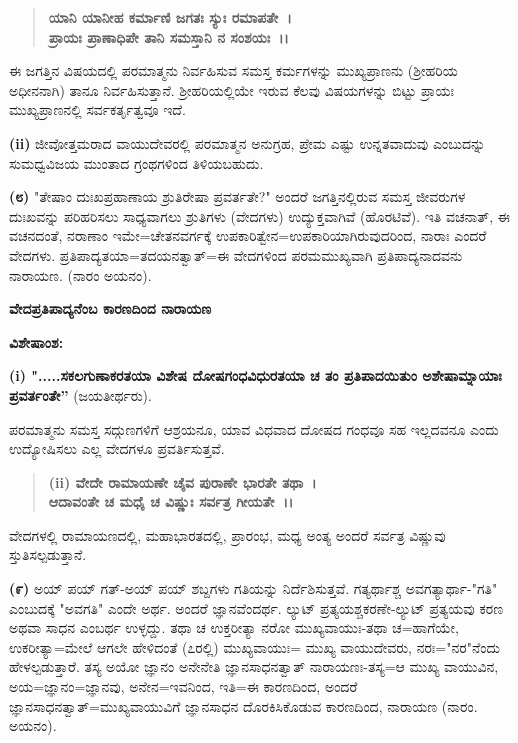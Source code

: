 \begin{verse}
\textbf{ಯಾನಿ ಯಾನೀಹ ಕರ್ಮಾಣಿ ಜಗತಃ ಸ್ಯುಃ ರಮಾಪತೇ~।}\\\textbf{ಪ್ರಾಯಃ ಪ್ರಾಣಾಧಿಪೇ ತಾನಿ ಸಮಸ್ತಾನಿ ನ ಸಂಶಯಃ~।।}
\end{verse}


ಈ ಜಗತ್ತಿನ ವಿಷಯದಲ್ಲಿ ಪರಮಾತ್ಮನು ನಿರ್ವಹಿಸುವ ಸಮಸ್ತ ಕರ್ಮಗಳನ್ನು ಮುಖ್ಯಪ್ರಾಣನು (ಶ‍್ರೀಹರಿಯ ಅಧೀನನಾಗಿ) ತಾನೂ ನಿರ್ವಹಿಸುತ್ತಾನೆ. ಶ‍್ರೀಹರಿಯಲ್ಲಿಯೇ ಇರುವ ಕೆಲವು ವಿಷಯಗಳನ್ನು ಬಿಟ್ಟು ಪ್ರಾಯಃ ಮುಖ್ಯಪ್ರಾಣನಲ್ಲಿ ಸರ್ವಕರ್ತೃತ್ವವೂ ಇದೆ.

\textbf{(ii)} ಜೀವೋತ್ತಮರಾದ ವಾಯುದೇವರಲ್ಲಿ ಪರಮಾತ್ಮನ ಅನುಗ್ರಹ, ಪ್ರೇಮ ಎಷ್ಟು ಉನ್ನತವಾದುವು ಎಂಬುದನ್ನು ಸುಮಧ್ವವಿಜಯ ಮುಂತಾದ ಗ್ರಂಥಗಳಿಂದ ತಿಳಿಯಬಹುದು.

\textbf{(೮)} "ತೇಷಾಂ ದುಃಖಪ್ರಹಾಣಾಯ ಶ್ರುತಿರೇಷಾ ಪ್ರವರ್ತತೇ?" ಅಂದರೆ ಜಗತ್ತಿನಲ್ಲಿರುವ ಸಮಸ್ತ ಜೀವರುಗಳ ದುಃಖವನ್ನು ಪರಿಹರಿಸಲು ಸಾಧ್ಯವಾಗಲು ಶ್ರುತಿಗಳು (ವೇದಗಳು) ಉದ್ಯುಕ್ತವಾಗಿವೆ (ಹೊರಟಿವೆ). ಇತಿ ವಚನಾತ್, ಈ ವಚನದಂತೆ, ನರಾಣಾಂ ಇಮೇ=ಚೇತನವರ್ಗಕ್ಕೆ ಉಪಕಾರಿತ್ವೇನ=ಉಪಕಾರಿಯಾಗಿರುವುದರಿಂದ, ನಾರಾಃ ಎಂದರೆ ವೇದಗಳು. ಪ್ರತಿಪಾದ್ಯತಯಾ=ತದಯನತ್ವಾತ್=ಈ ವೇದಗಳಿಂದ ಪರಮಮುಖ್ಯವಾಗಿ ಪ್ರತಿಪಾದ್ಯನಾದವನು ನಾರಾಯಣ. (ನಾರಂ ಅಯನಂ).

\begin{center}
\textbf{ವೇದಪ್ರತಿಪಾದ್ಯನೆಂಬ ಕಾರಣದಿಂದ ನಾರಾಯಣ}
\end{center}

\noindent
\textbf{ವಿಶೇಷಾಂಶ:\enginline{-}}

\textbf{(i) ".....ಸಕಲಗುಣಾಕರತಯಾ ವಿಶೇಷ ದೋಷಗಂಧವಿಧುರತಯಾ ಚ ತಂ ಪ್ರತಿಪಾದಯಿತುಂ ಅಶೇಷಾಮ್ನಾಯಾಃ ಪ್ರವರ್ತಂತೇ”} (ಜಯತೀರ್ಥರು).

ಪರಮಾತ್ಮನು ಸಮಸ್ತ ಸದ್ಗುಣಗಳಿಗೆ ಆಶ್ರಯನೂ, ಯಾವ ವಿಧವಾದ ದೋಷದ ಗಂಧವೂ ಸಹ ಇಲ್ಲದವನೂ ಎಂದು ಉದ್ಯೋಷಿಸಲು ಎಲ್ಲ ವೇದಗಳೂ ಪ್ರವರ್ತಿಸುತ್ತವೆ.

\begin{verse}
\textbf{(ii) ವೇದೇ ರಾಮಾಯಣೇ ಚೈವ ಪುರಾಣೇ ಭಾರತೇ ತಥಾ~।}\\\textbf{ಆದಾವಂತೇ ಚ ಮಧೈ ಚ ವಿಷ್ಣುಃ ಸರ್ವತ್ರ ಗೀಯತೇ~।।}
\end{verse}


ವೇದಗಳಲ್ಲಿ ರಾಮಾಯಣದಲ್ಲಿ, ಮಹಾಭಾರತದಲ್ಲಿ, ಪ್ರಾರಂಭ, ಮಧ್ಯ ಅಂತ್ಯ ಅಂದರೆ ಸರ್ವತ್ರ ವಿಷ್ಣುವು ಸ್ತುತಿಸಲ್ಪಡುತ್ತಾನೆ.

\textbf{(೯)} ಅಯ್ ಪಯ್ ಗತ್‌-ಅಯ್ ಪಯ್ ಶಬ್ದಗಳು ಗತಿಯನ್ನು ನಿರ್ದೆಶಿಸುತ್ತವೆ. ಗತ್ಯರ್ಥಾಶ್ಚ ಅವಗತ್ಯಾರ್ಥಾ-"ಗತಿ" ಎಂಬುದಕ್ಕೆ "ಅವಗತಿ" ಎಂದೇ ಅರ್ಥ. ಅಂದರೆ ಜ್ಞಾನವೆಂದರ್ಥ. ಲ್ಯುಟ್ ಪ್ರತ್ಯಯಶ್ಚಕರಣೇ-ಲ್ಯುಟ್ ಪ್ರತ್ಯಯವು ಕರಣ ಅಥವಾ ಸಾಧನ ಎಂಬರ್ಥ ಉಳ್ಳದ್ದು. ತಥಾ ಚ ಉಕ್ತರೀತ್ಯಾ ನರೋ ಮುಖ್ಯವಾಯುಃ-ತಥಾ ಚ=ಹಾಗೆಯೇ, ಉಕರೀತ್ಯಾ=ಮೇಲೆ ಆಗಲೇ ಹೇಳಿದಂತೆ (೭ರಲ್ಲಿ) ಮುಖ್ಯವಾಯುಃ= ಮುಖ್ಯ ವಾಯುದೇವರು, ನರಃ="ನರ"ನೆಂದು ಹೇಳಲ್ಪಡುತ್ತಾರೆ. ತಸ್ಯ ಅಯೋ ಜ್ಞಾನಂ ಅನೇನೇತಿ ಜ್ಞಾನಸಾಧನತ್ವಾತ್ ನಾರಾಯಣಃ-ತಸ್ಯ=ಆ ಮುಖ್ಯ ವಾಯುವಿನ, ಅಯ=ಜ್ಞಾನಂ=ಜ್ಞಾನವು, ಅನೇನ=ಇವನಿಂದ, ಇತಿ=ಈ ಕಾರಣದಿಂದ, ಅಂದರೆ ಜ್ಞಾನಸಾಧನತ್ವಾತ್=ಮುಖ್ಯವಾಯು\-ವಿಗೆ ಜ್ಞಾನಸಾಧನ ದೊರಕಿಸಿಕೊಡುವ ಕಾರಣದಿಂದ, ನಾರಾಯಣ (ನಾರಂ. ಅಯನಂ).

